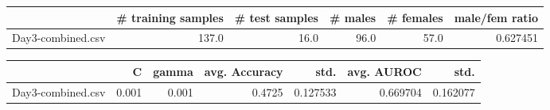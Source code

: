 \begin{tabular}{lrrrrr}
\hline
{} &  \# training samples &  \# test samples &  \# males &  \# females &  male/fem ratio \\
\hline
Day3-combined.csv &               137.0 &            16.0 &     96.0 &       57.0 &        0.627451 \\
\hline
\end{tabular}
\begin{tabular}{lrrrrrr}
\hline
{} &      C &  gamma &  avg. Accuracy &      std. &  avg. AUROC &      std. \\
\hline
Day3-combined.csv &  0.001 &  0.001 &         0.4725 &  0.127533 &    0.669704 &  0.162077 \\
\hline
\end{tabular}
